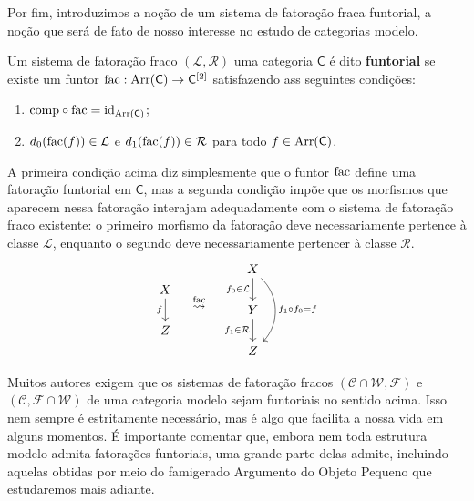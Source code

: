 Por fim, introduzimos a noção de um sistema de fatoração fraca funtorial, a noção que será de fato de nosso interesse no estudo de categorias modelo.

\begin{defin}\label{defin:fatoracao_fraca_funtorial}
  Um sistema de fatoração fraco $(\mathcal{L},\mathcal{R})$ uma categoria $\mathsf{C}$ é dito \textbf{funtorial} se existe um funtor $\mathrm{fac}: \mathrm{Arr}(\mathsf{C}) \to \mathsf{C}^{[2]}$ satisfazendo ass seguintes condições:
  \begin{enumerate}
  \item $\mathrm{comp} \circ \mathrm{fac} = \mathrm{id}_{\mathrm{Arr}(\mathsf{C})}$;
    
  \item $d_{0}(\mathrm{fac}(f)) \in \mathcal{L}$ e $d_{1}(\mathrm{fac}(f)) \in \mathcal{R}$ para todo $f \in \mathrm{Arr}(\mathsf{C})$.
  \end{enumerate}
\end{defin}

A primeira condição acima diz simplesmente que o funtor $\mathrm{fac}$ define uma fatoração funtorial em $\mathsf{C}$, mas a segunda condição impõe que os morfismos que aparecem nessa fatoração interajam adequadamente com o sistema de fatoração fraco existente: o primeiro morfismo da fatoração deve necessariamente pertence à classe $\mathcal{L}$, enquanto o segundo deve necessariamente pertencer à classe $\mathcal{R}$.
\begin{displaymath}
  \begin{tikzcd}
    X
    \arrow[d, "f" swap]
    \\ Z
  \end{tikzcd}
  \quad \overset{\fac}{\rightsquigarrow} \quad
  \begin{tikzcd}
    X
    \arrow[d, "f_{0} \in \mathcal{L}" swap]
    \arrow[dd, bend left=45, "f_{1} \circ f_{0} = f"]
    \\ Y
    \arrow[d, "f_{1} \in \mathcal{R}" swap]
    \\ Z
  \end{tikzcd}
\end{displaymath}

Muitos autores exigem que os sistemas de fatoração fracos $(\mathcal{C} \cap \mathcal{W},\mathcal{F})$ e $(\mathcal{C},\mathcal{F} \cap \mathcal{W})$ de uma categoria modelo sejam funtoriais no sentido acima.
Isso nem sempre é estritamente necessário, mas é algo que facilita a nossa vida em alguns momentos.
É importante comentar que, embora nem toda estrutura modelo admita fatorações funtoriais, uma grande parte delas admite, incluindo aquelas obtidas por meio do famigerado Argumento do Objeto Pequeno que estudaremos mais adiante.

